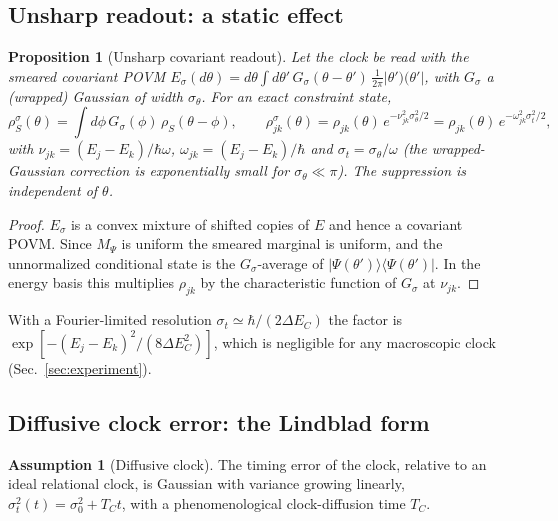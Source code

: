 \documentclass[aps,prd,onecolumn,notitlepage,10pt,amsmath,amssymb,amsfonts,nofootinbib]{revtex4-2}
\newtheorem{proposition}{Proposition}
\theoremstyle{definition}
\newtheorem{assumption}{Assumption}
\theoremstyle{remark}
\newcommand{\pket}[1]{|#1)}
\newcommand{\pbra}[1]{(#1|}
\begin{document}
\subsection{Unsharp readout: a static effect}
\begin{proposition}[Unsharp covariant readout]
\label{prop:unsharp}
Let the clock be read with the smeared covariant POVM $E_\sigma(d\theta)=d\theta\int d\theta'\,G_\sigma(\theta-\theta')\,\frac{1}{2\pi}\pket{\theta'}\pbra{\theta'}$, with $G_\sigma$ a (wrapped) Gaussian of width $\sigma_\theta$. For an exact constraint state,
\begin{equation}
  \rho_S^{\sigma}(\theta)=\int d\phi\,G_\sigma(\phi)\,\rho_S(\theta-\phi),\qquad
  \rho^{\sigma}_{jk}(\theta)=\rho_{jk}(\theta)\,e^{-\nu_{jk}^2\sigma_\theta^2/2}=\rho_{jk}(\theta)\,e^{-\omega_{jk}^2\sigma_t^2/2},
  \label{eq:static}
\end{equation}
with $\nu_{jk}=(E_j-E_k)/\hbar\omega$, $\omega_{jk}=(E_j-E_k)/\hbar$ and $\sigma_t=\sigma_\theta/\omega$ (the wrapped-Gaussian correction is exponentially small for $\sigma_\theta\ll\pi$). The suppression is \emph{independent of $\theta$}.
\end{proposition}

\begin{proof}
$E_\sigma$ is a convex mixture of shifted copies of $E$ and hence a covariant POVM. Since $M_\Psi$ is uniform the smeared marginal is uniform, and the unnormalized conditional state is the $G_\sigma$-average of $|\Psi(\theta')\rangle\langle\Psi(\theta')|$. In the energy basis this multiplies $\rho_{jk}$ by the characteristic function of $G_\sigma$ at $\nu_{jk}$.
\end{proof}

With a Fourier-limited resolution $\sigma_t\simeq\hbar/(2\Delta E_C)$ the factor is $\exp[-(E_j-E_k)^2/(8\Delta E_C^2)]$, which is negligible for any macroscopic clock (Sec.~\ref{sec:experiment}).

\subsection{Diffusive clock error: the Lindblad form}
\begin{assumption}[Diffusive clock]
\label{ass:diffusive}
The timing error of the clock, relative to an ideal relational clock, is Gaussian with variance growing linearly, $\sigma_t^2(t)=\sigma_0^2+T_Ct$, with a phenomenological clock-diffusion time $T_C$.
\end{assumption}
\end{document}
